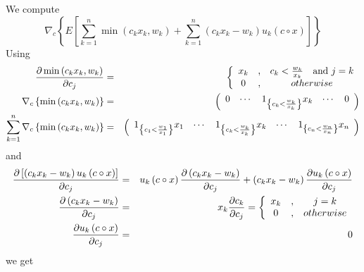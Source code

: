 \documentclass{article}
\begin{document}
We compute%
\[
\nabla _{c}\left\{ E\left[ \sum_{k=1}^{n}\min \left( c_{k}x_{k},w_{k}\right)
+\sum_{k=1}^{n}\left( c_{k}x_{k}-w_{k}\right) u_{k}\left( c\circ x\right) %
\right] \right\} 
\]%
Using%
\begin{eqnarray*}
\frac{\partial \min \left( c_{k}x_{k},w_{k}\right) }{\partial c_{j}}
&=&\left\{ 
\begin{array}{ccc}
x_{k} & , & c_{k}<\frac{w_{k}}{x_{k}}\text{ and }j=k \\ 
0 & , & otherwise%
\end{array}%
\right.  \\
\nabla _{c}\left\{ \min \left( c_{k}x_{k},w_{k}\right) \right\}  &=&\left( 
\begin{array}{ccccc}
0 & \cdots  & 1_{\left\{ c_{k}<\frac{w_{k}}{x_{k}}\right\} }x_{k} & \cdots 
& 0%
\end{array}%
\right)  \\
\sum_{k=1}^{n}\nabla _{c}\left\{ \min \left( c_{k}x_{k},w_{k}\right)
\right\}  &=&\left( 
\begin{array}{ccccc}
1_{\left\{ c_{1}<\frac{w_{1}}{x_{1}}\right\} }x_{1} & \cdots  & 1_{\left\{
c_{k}<\frac{w_{k}}{x_{k}}\right\} }x_{k} & \cdots  & 1_{\left\{ c_{n}<\frac{%
w_{n}}{x_{n}}\right\} }x_{n}%
\end{array}%
\right) 
\end{eqnarray*}%
and%
\begin{eqnarray*}
\frac{\partial \left[ \left( c_{k}x_{k}-w_{k}\right) u_{k}\left( c\circ
x\right) \right] }{\partial c_{j}} &=&u_{k}\left( c\circ x\right) \frac{%
\partial \left( c_{k}x_{k}-w_{k}\right) }{\partial c_{j}}+\left(
c_{k}x_{k}-w_{k}\right) \frac{\partial u_{k}\left( c\circ x\right) }{%
\partial c_{j}} \\
\frac{\partial \left( c_{k}x_{k}-w_{k}\right) }{\partial c_{j}} &=&x_{k}%
\frac{\partial c_{k}}{\partial c_{j}}=\left\{ 
\begin{array}{ccc}
x_{k} & , & j=k \\ 
0 & , & otherwise%
\end{array}%
\right.  \\
\frac{\partial u_{k}\left( c\circ x\right) }{\partial c_{j}} &=&0
\end{eqnarray*}%
we get%
\end{document}
